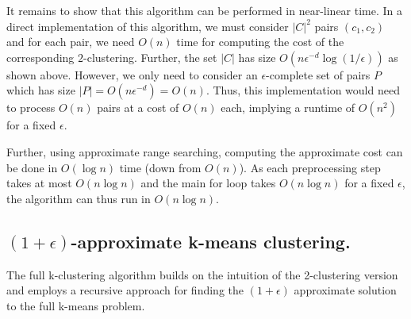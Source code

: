 
It remains to show that this algorithm can be performed in near-linear time.
In a direct implementation of this algorithm, we must consider $|C|^2$ pairs
$(c_1,c_2)$ and for each pair, we need $O(n)$ time for computing the cost of
the corresponding $2$-clustering. Further, the set $|C|$ has size $O(n \epsilon^{-d} \log (1/\epsilon))$
as shown above. However, we only need to consider an $\epsilon$-complete set of
pairs $P$ which has size $|P|=O(n \epsilon^{-d})=O(n)$. Thus, this implementation
would need to process $O(n)$ pairs at a cost of $O(n)$ each, implying a runtime of
$O(n^2)$ for a fixed $\epsilon$.

Further, using approximate range searching, computing the approximate cost can be done in $O(\log n)$ time (down from $O(n)$). As each preprocessing step takes at most $O(n \log n)$ and the main for loop takes $O(n \log n)$ for a fixed $\epsilon$, the algorithm can thus run in $O(n \log n)$.

\subsection{$(1+\epsilon)$-approximate k-means clustering.}

The full k-clustering algorithm builds on the intuition of the 2-clustering version and employs a recursive approach for finding the $(1+\epsilon)$ approximate solution to the full k-means problem.


